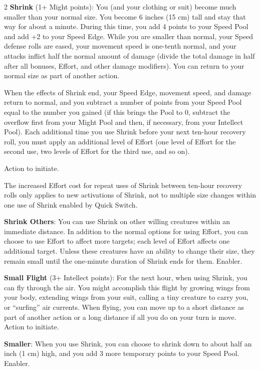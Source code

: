 \begin{multicols}{2}
\textbf{Shrink} (1+ Might points): You (and your clothing or suit) become much smaller than your normal size. You become 6 inches (15 cm) tall and stay that way for about a minute. During this time, you add 4 points to your Speed Pool and add +2 to your Speed Edge. While you are smaller than normal, your Speed defense rolls are eased, your movement speed is one-tenth normal, and your attacks inflict half the normal amount of damage (divide the total damage in half after all bonuses, Effort, and other damage modifiers). You can return to your normal size as part of another action.

When the effects of Shrink end, your Speed Edge, movement speed, and damage return to normal, and you subtract a number of points from your Speed Pool equal to the number you gained (if this brings the Pool to 0, subtract the overflow first from your Might Pool and then, if necessary, from your Intellect Pool). Each additional time you use Shrink before your next ten-hour recovery roll, you must apply an additional level of Effort (one level of Effort for the second use, two levels of Effort for the third use, and so on).

Action to initiate.

The increased Effort cost for repeat uses of Shrink between ten-hour recovery rolls only applies to new activations of Shrink, not to multiple size changes within one use of Shrink enabled by Quick Switch.

\textbf{Shrink Others}: You can use Shrink on other willing creatures within an immediate distance. In addition to the normal options for using Effort, you can choose to use Effort to affect more targets; each level of Effort affects one additional target. Unless these creatures have an ability to change their size, they remain small until the one-minute duration of Shrink ends for them. Enabler.

\textbf{Small Flight} (3+ Intellect points): For the next hour, when using Shrink, you can fly through the air. You might accomplish this flight by growing wings from your body, extending wings from your suit, calling a tiny creature to carry you, or “surfing” air currents. When flying, you can move up to a short distance as part of another action or a long distance if all you do on your turn is move. Action to initiate.

\textbf{Smaller}: When you use Shrink, you can choose to shrink down to about half an inch (1 cm) high, and you add 3 more temporary points to your Speed Pool. Enabler.


\end{multicols}
